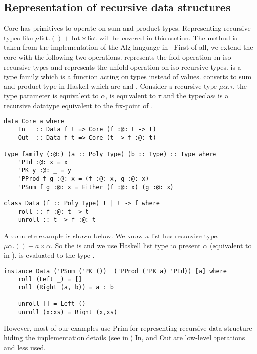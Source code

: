 \subsection{Representation of recursive data structures}
Core has primitives to operate on sum and product types. Representing recursive types like $\mu \text{list}. () + \text{Int} \times \text{list}$ will be covered in this section. The method is taken from the implementation of the Alg language in \cite{AlgebraicMultipartyProtocol}. First of all, we extend the core with the following two operations.  represents the fold operation on iso-recursive types and  represents the unfold operation on iso-recursive types.  is a type family which is a function acting on types instead of values.  converts  to sum and product type in Haskell which are \hask{(,)} and . Consider a recursive type $\mu \alpha. \tau$, the type parameter  is equivalent to $\alpha$,  is equivalent to $\tau$ and the typeclass  is a recursive datatype equivalent to the fix-point of .
\begin{verbatim}
data Core a where
    In   :: Data f t => Core (f :@: t -> t)
    Out  :: Data f t => Core (t -> f :@: t)

type family (:@:) (a :: Poly Type) (b :: Type) :: Type where
    'PId :@: x = x
    'PK y :@: _ = y
    'PProd f g :@: x = (f :@: x, g :@: x)
    'PSum f g :@: x = Either (f :@: x) (g :@: x)

class Data (f :: Poly Type) t | t -> f where
    roll :: f :@: t -> t
    unroll :: t -> f :@: t
\end{verbatim}
A concrete example is shown below. We know a list has recursive type: $\mu \alpha. () + a \times \alpha$. So the  is  and we use Haskell list type \hask{[a]} to present $\alpha$ (equivalent to  in  ).  is evaluated to the type .
\begin{verbatim}
instance Data ('PSum ('PK ())  ('PProd ('PK a) 'PId)) [a] where
    roll (Left _) = []
    roll (Right (a, b)) = a : b
  
    unroll [] = Left ()
    unroll (x:xs) = Right (x,xs)
\end{verbatim}

However, most of our examples use Prim for representing recursive data structure hiding the implementation details (see in ) In, and Out are low-level operations and less used. %

